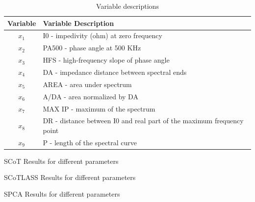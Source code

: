 \documentclass[11pt,letterpaper]{report}
\begin{document}
\begin{table}[htpb!]
\caption{Variable descriptions}
\label{tab1:dta_vars}
\begin{center}
 \begin{tabular}{||c l||}
 \hline
Variable & Variable Description \\ [0.5ex] 
 \hline\hline
 $x_{1}$ & I0 - impedivity (ohm) at zero frequency \\ 
 \hline
 $x_{2}$ & 	PA500 - phase angle at 500 KHz \\
 \hline
 $x_{3}$ & HFS - high-frequency slope of phase angle \\
 \hline
 $x_{4}$ & DA - impedance distance between spectral ends \\
 \hline
 $x_{5}$ & AREA - area under spectrum \\
 \hline
 $x_{6}$ & 	A/DA - area normalized by DA \\
 \hline
 $x_{7}$ & MAX IP - maximum of the spectrum \\
 \hline
 $x_{8}$ & 	DR - distance between I0 and real part of the maximum frequency point \\
 \hline
 $x_{9}$ & P - length of the spectral curve \\ [1ex] 
 \hline
\end{tabular}
\end{center}
\end{table}

\begin{table}[htpb!]
    \centering
    \caption{SCoT Results for different parameters}
    \label{rstl:scot}
    
\end{table}

\begin{table}[htpb!]
    \centering
    \caption{SCoTLASS Results for different parameters}
    \label{rstl:scotlass}
    
\end{table}

\begin{table}[htpb!]
    \centering
    \caption{SPCA Results for different parameters}
    \label{rstl:spca}
    
\end{table}
\end{document}
